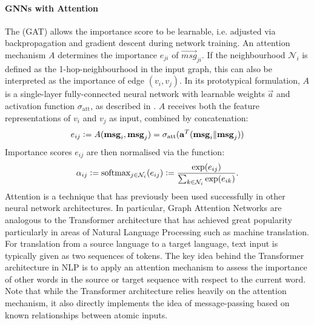 \documentclass[
	fontsize=10pt, %
	twoside=false, %
	secnumdepth=1, %
  toc=indentunnumbered %
]{kaobook}
\begin{document}
\paragraph{GNNs with Attention} The  (GAT)
\cite{velickovic_graph_2018} allows the importance score to be learnable, i.e.
adjusted via backpropagation and gradient descent during network training. An
attention mechanism $A$ determines the importance $e_{ji}$ of $\vec{msg}_{ji}$.
If the neighbourhood $\mathcal{N}_i$ is defined as the 1-hop-neighbourhood in
the input graph, this can also be interpreted as the importance of edge $(v_i,
v_j)$. In its prototypical formulation, $A$ is a single-layer fully-connected
neural network with learnable weights $\vec a$ and activation function
$\sigma_{\text{att}}$, as described in . $A$ receives
both the feature representations of $v_i$ and $v_j$ as input, combined by
concatenation:
\begin{align}
  e_{ij} := A(\mathbf{msg}_i, \mathbf{msg}_j) = \sigma_{\text{att}}(\mathbf{a}^T( \mathbf{msg}_i \| \mathbf{msg}_j))
\end{align}
Importance scores $e_{ij}$ are then normalised via the  function:
\begin{align}
  \alpha_{ij} := \text{softmax}_{j \in \mathcal{N}_i}(e_{ij}) := \frac{\exp(e_{ij})}{\sum_{k \in \mathcal{N}_i} \exp(e_{ik})}.
  \label{eq:softmax}
\end{align}
Attention is a technique that has previously been used successfully in other
neural network architectures. In particular, Graph Attention Networks are
analogous to the Transformer architecture \cite{vaswani_AttentionAllYou_2017}
that has achieved great popularity particularly in areas of Natural Language
Processing such as machine translation. For translation from a source language
to a target language, text input is typically given as two sequences of tokens.
The key idea behind the Transformer architecture in NLP is to apply an attention
mechanism to assess the importance of other words in the source or target
sequence with respect to the current word.
Note that while the Transformer architecture relies heavily on the attention
mechanism, it also directly implements the idea of message-passing based on
known relationships between atomic inputs.

\end{document}
